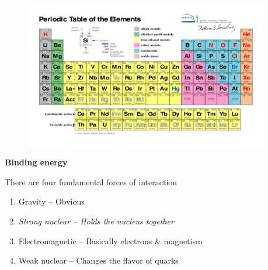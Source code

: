\documentclass[aspectratio=1610,pdftex,dvipsnames,compress,xcolor={dvipsnames}]{beamer}
\begin{document}
\begin{frame}{}
    \begin{figure}
        \centering
        \href{https://ptable.com/}{\includegraphics[width=0.95\textwidth]{periodic.table.jpg}}
    \end{figure}
\end{frame}


\begin{frame}[plain]{}
    \centering\LARGE\textbf{Binding energy}
\end{frame}


\addtocounter{framenumber}{-1}
\begin{frame}{There are four fundamental forces of interaction}
    \begin{enumerate}[series=outerlist,topsep=0pt,itemsep=21pt,leftmargin=*,label=(\arabic*)]
        \item[]Gravity -- Obvious
        \item[]\textit{Strong nuclear -- Holds the nucleus together}
        \item[]Electromagnetic -- Basically electrons \& magnetism
        \item[]Weak nuclear -- Changes the flavor of quarks
    \end{enumerate}
\end{frame}
\end{document}
